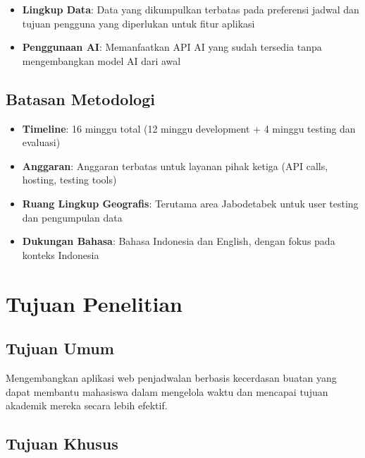 \begin{itemize}
\item \textbf{Lingkup Data}: Data yang dikumpulkan terbatas pada preferensi jadwal dan tujuan pengguna yang diperlukan untuk fitur aplikasi
\item \textbf{Penggunaan AI}: Memanfaatkan API AI yang sudah tersedia tanpa mengembangkan model AI dari awal
\end{itemize}

\subsection{Batasan Metodologi}

\begin{itemize}
\item \textbf{Timeline}: 16 minggu total (12 minggu development + 4 minggu testing dan evaluasi)
\item \textbf{Anggaran}: Anggaran terbatas untuk layanan pihak ketiga (API calls, hosting, testing tools)
\item \textbf{Ruang Lingkup Geografis}: Terutama area Jabodetabek untuk user testing dan pengumpulan data
\item \textbf{Dukungan Bahasa}: Bahasa Indonesia dan English, dengan fokus pada konteks Indonesia
\end{itemize}

\section{Tujuan Penelitian}

\subsection{Tujuan Umum}

Mengembangkan aplikasi web penjadwalan berbasis kecerdasan buatan yang dapat membantu mahasiswa dalam mengelola waktu dan mencapai tujuan akademik mereka secara lebih efektif.

\subsection{Tujuan Khusus}

